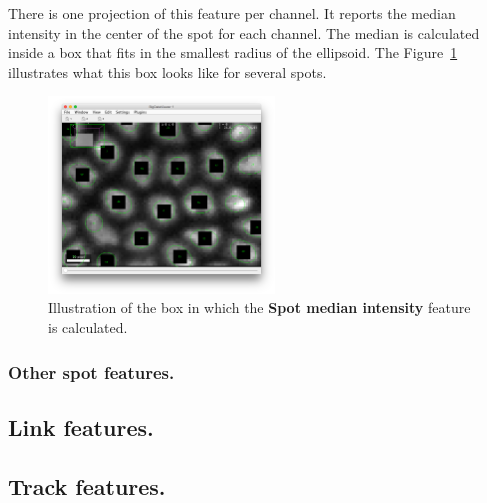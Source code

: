 There is one projection of this feature per channel.
It reports the median intensity in the center of the spot for each channel.
The median is calculated inside a box that fits in the smallest radius of the ellipsoid.
The Figure~\ref{fig:SpotMedianBox} illustrates what this box looks like for several spots.

\begin{figure}
    \centering
    \includegraphics[width=6cm]{figures/Mastodon_Median-feature-pixels.png}
    \caption{Illustration of the box in which the \textbf{Spot median intensity} feature is calculated.}
    \label{fig:SpotMedianBox}
\end{figure}

\subsubsection{Other spot features.}


\subsection{Link features.}

\subsection{Track features.}